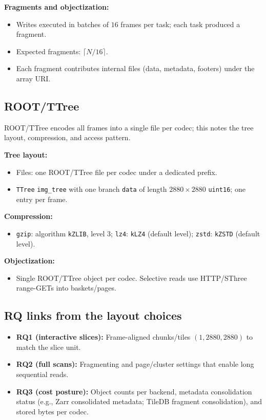\documentclass[nomenclature, english, bibtex]{kththesis}
\numberwithin{listing}{chapter}
\begin{document}
\textbf{Fragments and objectization:}
\begin{itemize}
  \item Writes executed in batches of $16$ frames per task; each task produced a fragment.
  \item Expected fragments: $\lceil N/16\rceil$.
  \item Each fragment contributes internal files (data, metadata, footers) under the array URI.
\end{itemize}

\subsection{\texorpdfstring{\gls{ROOT}/\gls{TTree}}{ROOT/TTree}} \gls{ROOT}/\gls{TTree} encodes all frames into a single file per codec; this notes the tree layout, compression, and access pattern.

\textbf{Tree layout:}
\begin{itemize}
  \item Files: one \gls{ROOT}/\gls{TTree} file per codec under a dedicated prefix.
  \item \texttt{TTree} \texttt{img\_tree} with one branch \texttt{data} of length $2880\times2880$ \texttt{uint16}; one entry per frame.
\end{itemize}

\textbf{Compression:}
\begin{itemize}
  \item \texttt{gzip}: algorithm \texttt{kZLIB}, level $3$; \texttt{lz4}: \texttt{kLZ4} (default level); \texttt{zstd}: \texttt{kZSTD} (default level).
\end{itemize}

\textbf{Objectization:}
\begin{itemize}
  \item Single \gls{ROOT}/\gls{TTree} object per codec. Selective reads use \gls{HTTP}/\gls{SThree} range-GETs into baskets/pages.
\end{itemize}

\subsection{RQ links from the layout choices}
\begin{itemize}
  \item \textbf{RQ1 (interactive slices):} Frame-aligned chunks/tiles $(1,2880,2880)$ to match the slice unit.
  \item \textbf{RQ2 (full scans):} Fragmenting and page/cluster settings that enable long sequential reads.
  \item \textbf{RQ3 (cost posture):} Object counts per backend, metadata consolidation status (e.g., Zarr consolidated metadata; TileDB fragment consolidation), and stored bytes per codec.
\end{itemize}
\end{document}
